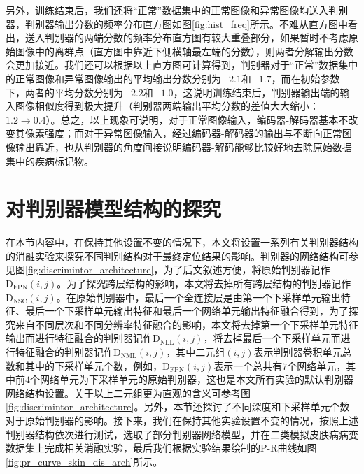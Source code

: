 另外，训练结束后，我们还将“正常”数据集中的正常图像和异常图像均送入判别器，判别器输出分数的频率分布直方图如图\ref{fig:hist_freq}所示。不难从直方图中看出，送入判别器的两端分数的频率分布直方图有较大重叠部分，如果暂时不考虑原始图像中的离群点（直方图中靠近下侧横轴最左端的分数），则两者分解输出分数会更加接近。我们还可以根据以上直方图可计算得到，判别器对于“正常”数据集中的正常图像和异常图像输出的平均输出分数分别为$-2.1$和$-1.7$，而在初始参数下，两者的平均分数分别为$-2.2$和$-1.0$，这说明训练结束后，判别器输出端的输入图像相似度得到极大提升（判别器两端输出平均分数的差值大大缩小：$1.2\rightarrow 0.4$）。总之，以上现象可说明，对于正常图像输入，编码器-解码器基本不改变其像素强度；而对于异常图像输入，经过编码器-解码器的输出与不断向正常图像输出靠近，也从判别器的角度间接说明编码器-解码能够比较好地去除原始数据集中的疾病标记物。


\section{对判别器模型结构的探究}\label{sec:dis_arch}
在本节内容中，在保持其他设置不变的情况下，本文将设置一系列有关判别器结构的消融实验来探究不同判别结构对于最终定位结果的影响。判别器的网络结构可参见图\ref{fig:discrimintor_architecture}，为了后文叙述方便，将原始判别器记作$\mathrm{D}_\mathrm{FPN}(i,j)$。为了探究跨层结构的影响，本文将去掉所有跨层结构的判别器记作$\mathrm{D}_\mathrm{NSC}(i,j)$。在原始判别器中，最后一个全连接层是由第一个下采样单元输出特征、最后一个下采样单元输出特征和最后一个网络单元输出特征融合得到，为了探究来自不同层次和不同分辨率特征融合的影响，本文将去掉第一个下采样单元特征输出而进行特征融合的判别器记作$\mathrm{D}_\mathrm{NLL}(i,j)$，将去掉最后一个下采样单元而进行特征融合的判别器记作$\mathrm{D}_\mathrm{NML}(i,j)$，其中二元组$(i,j)$表示判别器卷积单元总数和其中的下采样单元个数，例如，$\mathrm{D}_\mathrm{FPN}(i,j)$表示一个总共有$7$个网络单元，其中前$4$个网络单元为下采样单元的原始判别器，这也是本文所有实验的默认判别器网络结构设置。关于以上二元组更为直观的含义可参考图\ref{fig:discrimintor_architecture}。另外，本节还探讨了不同深度和下采样单元个数对于原始判别器的影响。接下来，我们在保持其他实验设置不变的情况，按照上述判别器结构依次进行测试，选取了部分判别器网络模型，并在二类模拟皮肤病病变数据集上完成相关消融实验，最后我们根据实验结果绘制的P-R曲线如图\ref{fig:pr_curve_skin_dis_arch}所示。

